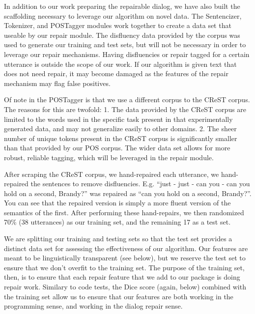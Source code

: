 \documentclass{article}
\begin{document}
\begin{flushleft}

  In addition to our work preparing the repairable dialog, we have also built the scaffolding necessary to leverage our algorithm on novel data. The Sentencizer, Tokenizer, and POSTagger modules work together to create a data set that useable by our repair module. The disfluency data provided by the corpus was used to generate our training and test sets, but will not be necessary in order to leverage our repair mechanisms. Having disfluencies or repair tagged for a certain utterance is outside the scope of our work. If our algorithm is given text that does not need repair, it may become damaged as the features of the repair mechanism may flag false positives.

\end{flushleft}

\begin{flushleft}

  Of note in the POSTagger is that we use a different corpus to the CReST corpus. The reasons for this are twofold: 1. The data provided by the CReST corpus are limited to the words used in the specific task present in that experimentally generated data, and may not generalize easily to other domains. 2. The sheer number of unique tokens present in the CReST corpus is significantly smaller than that provided by our POS corpus. The wider data set allows for more robust, reliable tagging, which will be leveraged in the repair module.

\end{flushleft}
  
\begin{flushleft}

After scraping the CReST corpus, we hand-repaired each utterance, we hand-repaired the sentences to remove disfluencies. E.g. ``just - just - can you - can you hold on a second, Brandy?'' was repaired as ``can you hold on a second, Brandy?''. You can see that the repaired version is simply a more fluent version of the semantics of the first. After performing these hand-repairs, we then randomized 70\% (38 utterances) as our training set, and the remaining 17 as a test set.
  
\end{flushleft}

\begin{flushleft}

  We are splitting our training and testing sets so that the test set provides a distinct data set for assessing the effectiveness of our algorithm. Our features are meant to be linguistically transparent (see below), but we reserve the test set to ensure that we don't overfit to the training set. The purpose of the training set, then, is to ensure that each repair feature that we add to our package is doing repair work. Similary to code tests, the Dice score (again, below) combined with the training set allow us to ensure that our features are both working in the programming sense, and working in the dialog repair sense.
  
\end{flushleft}
\end{document}
